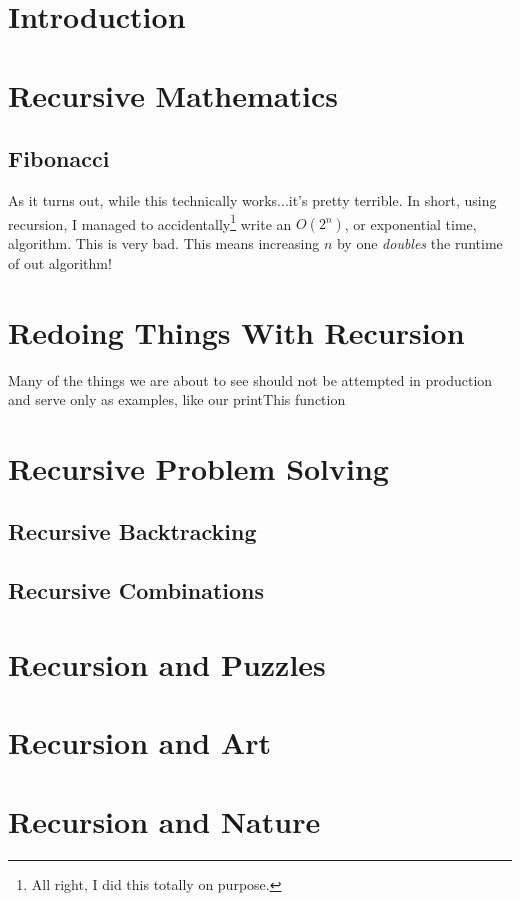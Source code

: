 \documentclass[10pt,a4paper]{book}
\begin{document}
\section{Introduction}

\section{Recursive Mathematics}

\subsection{Fibonacci}
As it turns out, while this technically works...it's pretty terrible.  In short, using recursion, I managed to accidentally\footnote{All right, I did this totally on purpose.} write an $ O(2^n) $, or exponential time,  algorithm.  This is very bad.  This means increasing $ n $ by one \emph{doubles} the runtime of out algorithm!


\section{Redoing Things With Recursion}
Many of the things we are about to see should not be attempted in production and serve only as examples, like our printThis function


\section{Recursive Problem Solving}

\subsection{Recursive Backtracking}
\subsection{Recursive Combinations}



\section{Recursion and Puzzles}


\section{Recursion and Art}
\section{Recursion and Nature}
\end{document}

